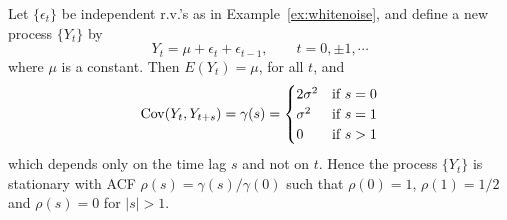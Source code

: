 \begin{ex} \label{ex:movingaverage} Let $\{\epsilon_t\}$ be independent r.v.'s as in Example~\ref{ex:whitenoise}, and define a new process $\{Y_t\}$ by
	\[
	Y_t = \mu + \epsilon_t + \epsilon_{t-1}, \qquad t=0, \pm1, \cdots
	\]
where $\mu$ is a constant.  Then $E(Y_t)=\mu$, for all $t$, and
	\[
	\operatorname{Cov}(Y_t,Y_{t+s})=\gamma(s)=
	\begin{cases}
	 2\sigma^2 & \text{if } s=0 \\
	  \sigma^2 & \text{if } s=1 \\
	  0 & \text{if } s>1 \\
	\end{cases}
	\]
which depends only on the time lag $s$ and not on $t$.  Hence the process $\{Y_t\}$ is stationary with ACF $\rho(s)=\gamma(s)/\gamma(0)$ such that $\rho(0)=1$, $\rho(1)=1/2$ and $\rho(s)=0$ for $|s|>1$.
 

\end{ex}
